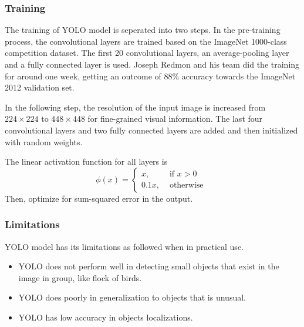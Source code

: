 \documentclass[catalog.tex]{subfiles}
\begin{document}
\subsubsection*{Training}
\par The training of YOLO model is seperated into two steps. In the pre-training process, the convolutional layers are trained based on the ImageNet 1000-class competition dataset. The first 20 convolutional layers, an average-pooling layer and a fully connected layer is used. Joseph Redmon and his team did the training for around one week, getting an outcome of 88\% accuracy towards the ImageNet 2012 validation set. ~\cite{redmon2015look}
\par In the following step, the resolution of the input image is increased from $224\times 224$ to $448 \times 448$ for fine-grained visual information. The last four convolutional layers and two fully connected layers are added and then initialized with random weights.
\par The linear activation function for all layers is 
$$
\phi(x)=\left\{\begin{array}{ll}{x,} & {\text { if } x>0} \\ {0.1 x,} & {\text { otherwise }}\end{array}\right.
$$
Then, optimize for sum-squared error in the output.

\subsubsection*{Limitations}
YOLO model has its limitations as followed when in practical use. ~\cite{redmon2015look}
\begin{itemize}
	\item YOLO does not perform well in detecting small objects that exist in the image in group, like flock of birds. 
	\item YOLO does poorly in generalization to objects that is unusual.
	\item YOLO has low accuracy in objects localizations.
\end{itemize}



\singlespacing
\printbibliography[title={References.},resetnumbers=true,heading=subbibliography]
\end{document}
